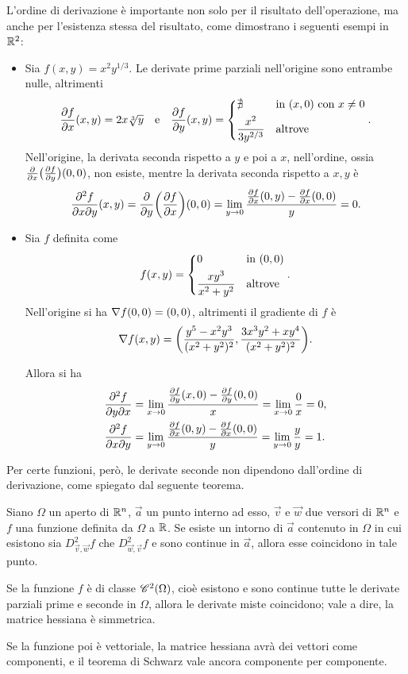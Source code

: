 L'ordine di derivazione è importante non solo per il risultato dell'operazione, ma anche per l'esistenza stessa del risultato, come dimostrano i seguenti esempi in $\R^2$:
\begin{itemize}
\item Sia $f(x,y)=x^2y^{1/3}$. Le derivate prime parziali nell'origine sono entrambe nulle, altrimenti
\[
\drp{f}{x}(x,y)=2x\sqrt[3]{y}\qtext{e}\drp{f}{y}(x,y)=\begin{dcases*}\nexists&in $(x,0)$ con $x\neq 0$\\\frac{x^2}{3y^{2/3}}&altrove\end{dcases*}.
\]
Nell'origine, la derivata seconda rispetto a $y$ e poi a $x$, nell'ordine, ossia $\drp{}{x}\big(\drp{f}{y}\big)(0,0)$, non esiste, mentre la derivata seconda rispetto a $x,y$ è
\[
\frac{\partial^2f}{\partial x\partial y}(x,y)=\drp{}{y}\bigg(\drp{f}{x}\bigg)(0,0)=\lim_{y\to 0}\frac{\drp{f}{x}(0,y)-\drp{f}{x}(0,0)}{y}=0.
\]
\item Sia $f$ definita come
\[
f(x,y)=\begin{dcases*}0&in $(0,0)$\\\frac{xy^3}{x^2+y^2}&altrove\end{dcases*}.
\]
Nell'origine si ha $\grad f(0,0)=(0,0)$, altrimenti il gradiente di $f$ è
\[
\grad f(x,y)=\bigg(\frac{y^5-x^2y^3}{(x^2+y^2)^2},\frac{3x^3y^2+xy^4}{(x^2+y^2)^2}\bigg).
\]

Allora si ha
\begin{align*}
&\frac{\partial^2f}{\partial y\partial x}=\lim_{x\to 0}\frac{\drp{f}{y}(x,0)-\drp{f}{y}(0,0)}{x}=\lim_{x\to 0}\frac0{x}=0,\\
&\frac{\partial^2f}{\partial x\partial y}=\lim_{y\to 0}\frac{\drp{f}{x}(0,y)-\drp{f}{x}(0,0)}{y}=\lim_{y\to 0}\frac{y}{y}=1.
\end{align*}
\end{itemize}
Per certe funzioni, però, le derivate seconde non dipendono dall'ordine di derivazione, come spiegato dal seguente teorema.
\begin{teorema}[di Schwartz] \label{t:schwarz}
Siano $\Omega$ un aperto di $\R^n$, $\vec a$ un punto interno ad esso, $\vec v$ e $\vec w$ due versori di $\R^n$ e $f$ una funzione definita da $\Omega$ a $\R$. Se esiste un intorno di $\vec a$ contenuto in $\Omega$ in cui esistono sia $D^2_{\vec v,\vec w}f$ che $D^2_{\vec w,\vec v}f$ e sono continue in $\vec a$, allora esse coincidono in tale punto.
\end{teorema}
\begin{corollario}
Se la funzione $f$ è di classe $\cont[2]{\Omega}$, cioè esistono e sono continue tutte le derivate parziali prime e seconde in $\Omega$, allora le derivate miste coincidono; vale a dire, la matrice hessiana è simmetrica.
\end{corollario}
Se la funzione poi è vettoriale, la matrice hessiana avrà dei vettori come componenti, e il teorema di Schwarz vale ancora componente per componente.%


